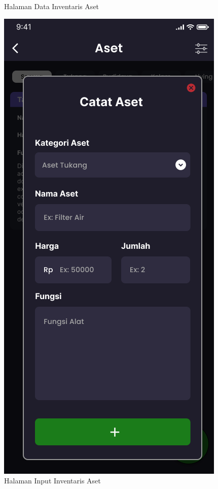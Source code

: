 \begin{enumerate}
\begin{enumerate}
\begin{figure}[H]
			  \caption{Halaman Data Inventaris Aset}
			\endminipage\hfill
			  \includegraphics[width=\linewidth]{gambar/sprint1/mockup_input_aset.png}
			  \caption{Halaman Input Inventaris Aset}
			\endminipage
		\end{figure}


\end{enumerate}
\end{enumerate}

